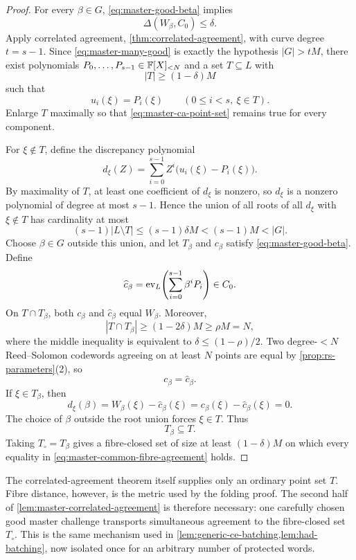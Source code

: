 \begin{proof}
For every $\beta\in G$, \eqref{eq:master-good-beta} implies
\[
  \Delta(W_\beta,C_0)\le\delta.
\]
Apply correlated agreement, \cref{thm:correlated-agreement}, with curve degree $t=s-1$.  Since \eqref{eq:master-many-good} is exactly the hypothesis $|G|>tM$, there exist polynomials $P_0,\ldots,P_{s-1}\in\mathbb{F}[X]_{<N}$ and a set $T\subseteq L$ with
\[
  |T|\ge(1-\delta)M
\]
such that
\begin{equation}
  u_i(\xi)=P_i(\xi)
  \qquad
  (0\le i<s,\ \xi\in T).
  \label{eq:master-ca-point-set}
\end{equation}
Enlarge $T$ maximally so that \eqref{eq:master-ca-point-set} remains true for every component.

For $\xi\notin T$, define the discrepancy polynomial
\begin{equation}
  d_\xi(Z)
  =\sum_{i=0}^{s-1}Z^i\bigl(u_i(\xi)-P_i(\xi)\bigr).
  \label{eq:master-discrepancy-polynomial}
\end{equation}
By maximality of $T$, at least one coefficient of $d_\xi$ is nonzero, so $d_\xi$ is a nonzero polynomial of degree at most $s-1$.  Hence the union of all roots of all $d_\xi$ with $\xi\notin T$ has cardinality at most
\begin{equation}
  (s-1)|L\setminus T|
  \le(s-1)\delta M
  <(s-1)M
  <|G|.
  \label{eq:master-root-union}
\end{equation}
Choose $\beta\in G$ outside this union, and let $T_\beta$ and $c_\beta$ satisfy \eqref{eq:master-good-beta}.  Define
\[
  \widehat c_\beta
  =\operatorname{ev}_L\!\left(\sum_{i=0}^{s-1}\beta^iP_i\right)\in C_0.
\]
On $T\cap T_\beta$, both $c_\beta$ and $\widehat c_\beta$ equal $W_\beta$.  Moreover,
\[
  |T\cap T_\beta|
  \ge(1-2\delta)M
  \ge\rho M
  =N,
\]
where the middle inequality is equivalent to $\delta\le(1-\rho)/2$.  Two degree-$<N$ Reed--Solomon codewords agreeing on at least $N$ points are equal by \cref{prop:rs-parameters}(2), so
\[
  c_\beta=\widehat c_\beta.
\]
If $\xi\in T_\beta$, then
\[
  d_\xi(\beta)
  =W_\beta(\xi)-\widehat c_\beta(\xi)
  =c_\beta(\xi)-\widehat c_\beta(\xi)
  =0.
\]
The choice of $\beta$ outside the root union forces $\xi\in T$.  Thus
\[
  T_\beta\subseteq T.
\]
Taking $T_\circ=T_\beta$ gives a fibre-closed set of size at least $(1-\delta)M$ on which every equality in \eqref{eq:master-common-fibre-agreement} holds.
\end{proof}

\begin{remark}
\label{rem:master-fibre-closed}
The correlated-agreement theorem itself supplies only an ordinary point set $T$.  Fibre distance, however, is the metric used by the folding proof.  The second half of \cref{lem:master-correlated-agreement} is therefore necessary: one carefully chosen good master challenge transports simultaneous agreement to the fibre-closed set $T_\circ$.  This is the same mechanism used in \cref{lem:generic-ce-batching,lem:had-batching}, now isolated once for an arbitrary number of protected words.
\end{remark}


